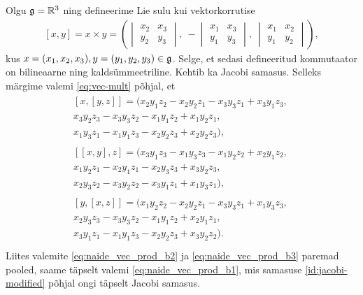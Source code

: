 \begin{naide}
    Olgu $\mathfrak{g} = \mathbb{R}^3$ ning defineerime Lie sulu kui vektorkorrutise
    \begin{align}\label{eq:vec-mult}
        [x, y] = x \times y = \left(
            \begin{vmatrix}
                x_2 & x_3 \\
                y_2 & y_3
            \end{vmatrix},\
            -\begin{vmatrix}
                x_1 & x_3 \\
                y_1 & y_3
            \end{vmatrix},\
            \begin{vmatrix}
                x_1 & x_2 \\
                y_1 & y_2
            \end{vmatrix}
        \right),
    \end{align}
    kus $x = (x_1, x_2, x_3), y = (y_1, y_2, y_3) \in \mathfrak{g}$. Selge, et sedasi
    defineeritud kommutaator on bilineaarne ning kaldsümmeetriline. Kehtib ka
    Jacobi samasus. Selleks märgime valemi \eqref{eq:vec-mult} põhjal, et
    \begin{align}
        \begin{split}
            [x, [y, z]] = (
                x_2 y_1 z_2 - x_2 y_2 z_1 - x_3 y_3 z_1 + x_3 y_1 z_3,\ \\
                x_3 y_2 z_3 - x_3 y_3 z_2 - x_1 y_1 z_2 + x_1 y_2 z_1,\ \\
                x_1 y_3 z_1 - x_1 y_1 z_3 - x_2 y_2 z_3 + x_2 y_2 z_3
            ),
        \end{split} \label{eq:naide_vec_prod_b1} \\
        \begin{split}
            [[x, y], z] = (
                x_3 y_1 z_3 - x_1 y_3 z_3 - x_1 y_2 z_2 + x_2 y_1 z_2,\ \\
                x_1 y_2 z_1 - x_2 y_1 z_1 - x_2 y_3 z_3 + x_3 y_2 z_3,\ \\
                x_2 y_3 z_2 - x_3 y_2 z_2 - x_3 y_1 z_1 + x_1 y_3 z_1
            ),
        \end{split} \label{eq:naide_vec_prod_b2} \\
        \begin{split}
            [y, [x, z]] = (
                x_1 y_2 z_2 - x_2 y_2 z_1 - x_3 y_3 z_1 + x_1 y_3 z_3,\ \\
                x_2 y_3 z_3 - x_3 y_3 z_2 - x_1 y_1 z_2 + x_2 y_1 z_1,\ \\
                x_3 y_1 z_1 - x_1 y_1 z_3 - x_2 y_2 z_3 + x_3 y_2 z_2
            ). \\
        \end{split} \label{eq:naide_vec_prod_b3}
    \end{align}
    Liites valemite \eqref{eq:naide_vec_prod_b2} ja
    \eqref{eq:naide_vec_prod_b3} paremad pooled, saame täpselt valemi
    \eqref{eq:naide_vec_prod_b1}, mis samasuse \eqref{id:jacobi-modified}
    põhjal ongi täpselt Jacobi samasus.
\end{naide}

